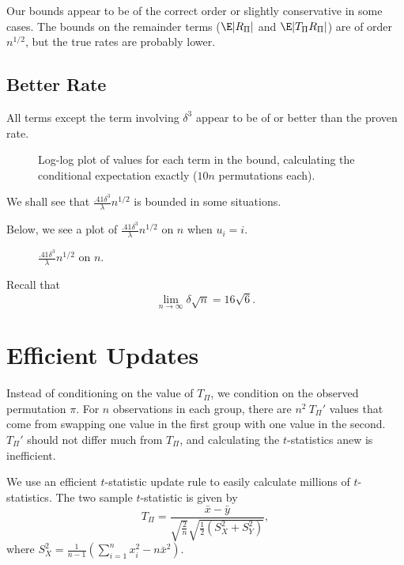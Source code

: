 Our bounds appear to be of the correct order or slightly conservative in some cases.  The bounds on
the remainder terms ($\E |R_{\Pi}|$ and $\E |T_{\Pi}R_{\Pi}|$) are of order $n^{1/2}$, but the true
rates are probably lower.
\clearpage

\subsection{Better Rate}
All terms except the term involving $\delta^3$ appear to be of or better than the proven rate.
\begin{figure}[!ht]
  \centering
  
  \caption{Log-log plot of values for each term in the bound, calculating the conditional
    expectation exactly ($10n$ permutations each).}
\end{figure}

We shall see that $\frac{.41 \delta^3}{\lambda}n^{1/2}$ is bounded in some situations.
\clearpage

Below, we see a plot of $\frac{.41 \delta^3}{\lambda}n^{1/2}$ on $n$
when $u_i = i$.
\begin{figure}[!ht]
  \centering
  
  \caption{$\frac{.41 \delta^3}{\lambda}n^{1/2}$ on $n$.}
\end{figure}

Recall that
\begin{equation*}
  \lim_{n \to \infty} \delta \sqrt{n} = 16 \sqrt{6}.
\end{equation*}

\section{Efficient Updates}
\label{S:efficient-updates}
Instead of conditioning on the value of $T_{\Pi}$, we condition on the
observed permutation $\pi$.  For $n$ observations in each group, there
are $n^2 \: T_{\Pi}'$ values that come from swapping one value in the first
group with one value in the second.  $T_{\Pi}'$ should not differ much from
$T_{\Pi}$, and calculating the $t$-statistics anew is inefficient.

We use an efficient $t$-statistic update rule to easily calculate
millions of $t$-statistics.  The two sample $t$-statistic is given by
\begin{equation*}
  T_{\Pi} = \frac{\bar{x}-\bar{y}}
  {\sqrt{\frac{2}{n}}\sqrt{\frac{1}{2}(S_X^2+S_Y^2)}},
\end{equation*}
where $S_X^2=\frac{1}{n-1}(\sum_{i=1}^nx_i^2-n\bar{x}^2)$.

